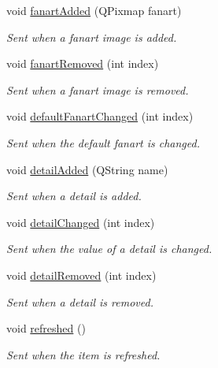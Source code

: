 \begin{DoxyCompactItemize}
void \hyperlink{class_a_w_e_1_1_media_item_abf09192d589c63cbbd3ca2643821807e}{fanart\-Added} (Q\-Pixmap fanart)
\begin{DoxyCompactList}\small\item\em Sent when a fanart image is added. \end{DoxyCompactList}\item 
void \hyperlink{class_a_w_e_1_1_media_item_a938bd4fc579b9dc8de8161ab508d2131}{fanart\-Removed} (int index)
\begin{DoxyCompactList}\small\item\em Sent when a fanart image is removed. \end{DoxyCompactList}\item 
void \hyperlink{class_a_w_e_1_1_media_item_a6a0037f48f16cff9bf20a3fa0384a95b}{default\-Fanart\-Changed} (int index)
\begin{DoxyCompactList}\small\item\em Sent when the default fanart is changed. \end{DoxyCompactList}\item 
void \hyperlink{class_a_w_e_1_1_media_item_a29ec8ca53dce71e8e060aad83318689e}{detail\-Added} (Q\-String name)
\begin{DoxyCompactList}\small\item\em Sent when a detail is added. \end{DoxyCompactList}\item 
void \hyperlink{class_a_w_e_1_1_media_item_ae2989c79a410a00d55e08cd74c5cda90}{detail\-Changed} (int index)
\begin{DoxyCompactList}\small\item\em Sent when the value of a detail is changed. \end{DoxyCompactList}\item 
void \hyperlink{class_a_w_e_1_1_media_item_a7e54f7fbc167e6803b7e385b5bc9c71c}{detail\-Removed} (int index)
\begin{DoxyCompactList}\small\item\em Sent when a detail is removed. \end{DoxyCompactList}\item 
\hypertarget{class_a_w_e_1_1_media_item_a546d9a0c58938b0a8e027945901604a1}{void \hyperlink{class_a_w_e_1_1_media_item_a546d9a0c58938b0a8e027945901604a1}{refreshed} ()}\label{class_a_w_e_1_1_media_item_a546d9a0c58938b0a8e027945901604a1}

\begin{DoxyCompactList}\small\item\em Sent when the item is refreshed. \end{DoxyCompactList}\end{DoxyCompactItemize}
